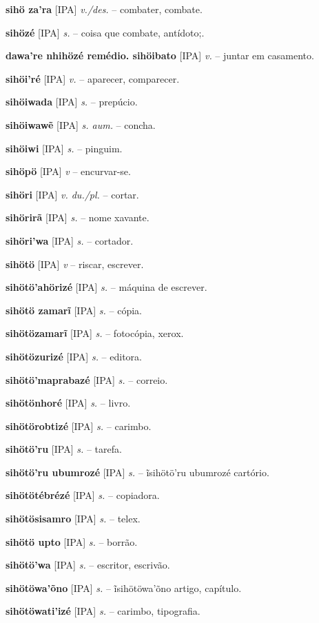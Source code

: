 {\textbf{sihö za'ra} [IPA] \textit{v./des.} -- combater, combate.

\textbf{sihözé} [IPA] \textit{s.} -- coisa que combate, antídoto;.

\textbf{dawa're nhihözé remédio. sihöibato} [IPA] \textit{v.} -- juntar em casamento.

\textbf{sihöi'ré} [IPA] \textit{v.} -- aparecer, comparecer.

\textbf{sihöiwada} [IPA] \textit{s.} -- prepúcio.

\textbf{sihöiwawẽ} [IPA] \textit{s. aum.} -- concha.

\textbf{sihöiwi} [IPA] \textit{s.} -- pinguim.

\textbf{sihöpö} [IPA] \textit{v} -- encurvar-se.

\textbf{sihöri} [IPA] \textit{v. du./pl.} -- cortar.

\textbf{sihörirã} [IPA] \textit{s.} -- nome xavante.

\textbf{sihöri'wa} [IPA] \textit{s.} -- cortador.

\textbf{sihötö} [IPA] \textit{v} -- riscar, escrever.

\textbf{sihötö'ahörizé} [IPA] \textit{s.} -- máquina de escrever.

\textbf{sihötö zamarĩ} [IPA] \textit{s.} -- cópia.

\textbf{sihötözamarĩ} [IPA] \textit{s.} -- fotocópia, xerox.

\textbf{sihötözurizé} [IPA] \textit{s.} -- editora.

\textbf{sihötö'maprabazé} [IPA] \textit{s.} -- correio.

\textbf{sihötönhoré} [IPA] \textit{s.} -- livro.

\textbf{sihötörobtizé} [IPA] \textit{s.} -- carimbo.

\textbf{sihötö'ru} [IPA] \textit{s.} -- tarefa.

\textbf{sihötö'ru ubumrozé} [IPA] \textit{s.} -- ĩsihötö'ru ubumrozé cartório.

\textbf{sihötötébrézé} [IPA] \textit{s.} -- copiadora.

\textbf{sihötösisamro} [IPA] \textit{s.} -- telex.

\textbf{sihötö upto} [IPA] \textit{s.} -- borrão.

\textbf{sihötö'wa} [IPA] \textit{s.} -- escritor, escrivão.

\textbf{sihötöwa'õno} [IPA] \textit{s.} -- ĩsihötöwa'õno artigo, capítulo.

\textbf{sihötöwati'izé} [IPA] \textit{s.} -- carimbo, tipografia.

}

